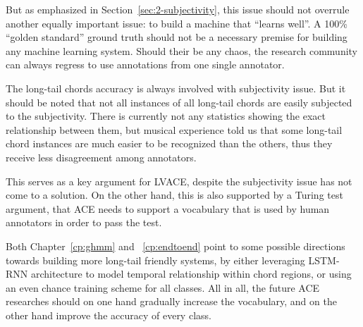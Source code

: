 But as emphasized in Section~\ref{sec:2-subjectivity}, this issue should not overrule another equally important issue: to build a machine that ``learns well''. A 100\% ``golden standard'' ground truth should not be a necessary premise for building any machine learning system. Should their be any chaos, the research community can always regress to use annotations from one single annotator.

The long-tail chords accuracy is always involved with subjectivity issue. But it should be noted that not all instances of all long-tail chords are easily subjected to the subjectivity. There is currently not any statistics showing the exact relationship between them, but musical experience told us that some long-tail chord instances are much easier to be recognized than the others, thus they receive less disagreement among annotators.

This serves as a key argument for LVACE, despite the subjectivity issue has not come to a solution. On the other hand, this is also supported by a Turing test argument, that ACE needs to support a vocabulary that is used by human annotators in order to pass the test.

Both Chapter~\ref{cp:ghmm} and ~\ref{cp:endtoend} point to some possible directions towards building more long-tail friendly systems, by either leveraging LSTM-RNN architecture to model temporal relationship within chord regions, or using an even chance training scheme for all classes. All in all, the future ACE researches should on one hand gradually increase the vocabulary, and on the other hand improve the accuracy of every class.




 






